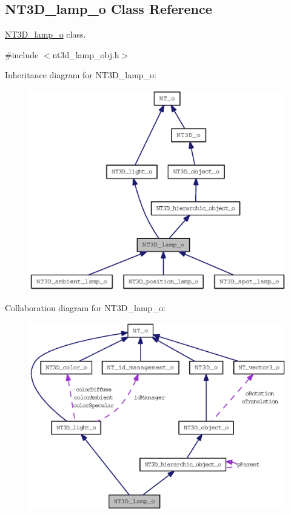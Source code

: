 \subsection{NT3D\_\-lamp\_\-o Class Reference}
\label{class_n_t3_d__lamp__o}


\hyperlink{class_n_t3_d__lamp__o}{NT3D\_\-lamp\_\-o} class.  




{\ttfamily \#include $<$nt3d\_\-lamp\_\-obj.h$>$}



Inheritance diagram for NT3D\_\-lamp\_\-o:
\nopagebreak
\begin{figure}[H]
\begin{center}
\leavevmode
\includegraphics[width=400pt]{class_n_t3_d__lamp__o__inherit__graph}
\end{center}
\end{figure}


Collaboration diagram for NT3D\_\-lamp\_\-o:
\nopagebreak
\begin{figure}[H]
\begin{center}
\leavevmode
\includegraphics[width=400pt]{class_n_t3_d__lamp__o__coll__graph}
\end{center}
\end{figure}
